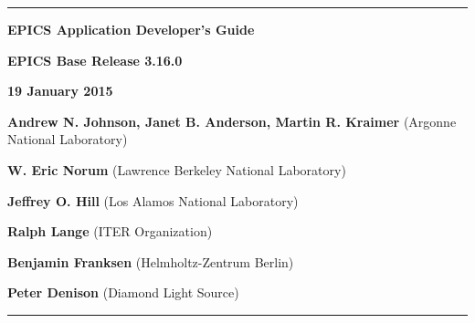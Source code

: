 \hrule

\vspace{1in}

\noindent \Huge \textbf{EPICS Application Developer's Guide}

\vspace{0.5in}

\noindent \Large \textbf{EPICS Base Release 3.16.0}

\noindent \textbf{19 January 2015}

\vspace{0.5in}

\normalsize
\noindent \textbf{Andrew N. Johnson, Janet B. Anderson, Martin R. Kraimer} (Argonne National Laboratory)

\noindent \textbf{W. Eric Norum} (Lawrence Berkeley National Laboratory)

\noindent \textbf{Jeffrey O. Hill} (Los Alamos National Laboratory)

\noindent \textbf{Ralph Lange} (ITER Organization)

\noindent \textbf{Benjamin Franksen} (Helmholtz-Zentrum Berlin)

\noindent \textbf{Peter Denison} (Diamond Light Source)

\vspace{1in}
\hrule
